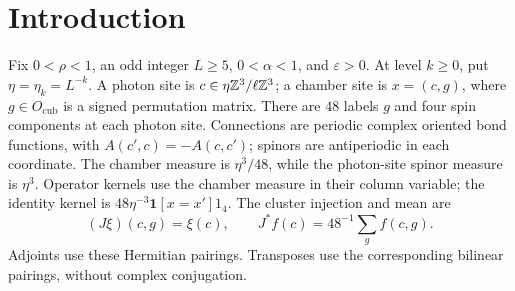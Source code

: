 \begin{abstract}
We prove uniform locality estimates for penalized chamber Dirac
operators on three-dimensional periodic lattices. A gap on the
mean-zero chamber components and a free Schur-complement estimate
give local inverse bounds independent of the mesh and reference
mass. Local real gauges and convergent walk expansions extend these
bounds to complex connections. We obtain analytic coarse covariances,
an exact weighted Grassmann block identity, and a local expansion of
the normalized determinant. Under additional charge and volume
conditions, the local determinant difference gains a factor
\(e_k^{1/4}\).
\end{abstract}
\maketitle
\tableofcontents
\section{Introduction}\label{sec:introduction}
Fix \(0<\rho<1\), an odd integer \(L\ge5\), \(0<\alpha<1\), and
\(\varepsilon>0\). At level \(k\ge0\), put \(\eta=\eta_k=L^{-k}\).
A photon site is \(c\in\eta\mathbb Z^3/\ell\mathbb Z^3\); a chamber site is
\(x=(c,g)\), where \(g\in O_{\mathrm{cub}}\) is a signed permutation
matrix. There are \(48\) labels \(g\) and four spin components at
each photon site. Connections are periodic complex oriented bond
functions, with \(A(c',c)=-A(c,c')\); spinors are antiperiodic in
each coordinate. The chamber measure is \(\eta^3/48\), while the
photon-site spinor measure is \(\eta^3\).
Operator kernels use the chamber measure in their column variable;
the identity kernel is \(48\eta^{-3}\mathbf1[x=x']1_4\).
The cluster injection and mean are
\[
 (J\xi)(c,g)=\xi(c),\qquad J^*f(c)=48^{-1}\sum_g f(c,g).
\]
Adjoints use these Hermitian pairings. Transposes use the corresponding
bilinear pairings, without complex conjugation.

